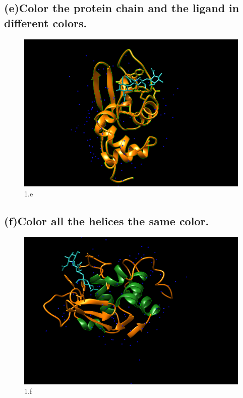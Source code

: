 \documentclass[a4paper, 12pt, one column]{article}
\begin{document}
\subsection*{(e)Color the protein chain and the ligand in different colors.}
\begin{figure}[H]
    \centering
    \includegraphics[width=.8\linewidth]{1_e.png}
    \caption{1.e}
    \label{fig:1_e.png}
\end{figure}

\subsection*{(f)Color all the helices the same color.}
\begin{figure}[H]
    \centering
    \includegraphics[width=.8\linewidth]{1_f.png}
    \caption{1.f}
    \label{fig:1_f.png}
\end{figure}
\end{document}
